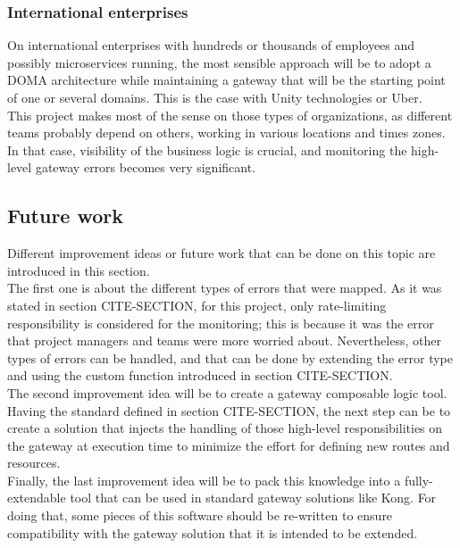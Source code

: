 \documentclass[english, 12pt, a4paper, sci, utf8, a-1b, online]{aaltothesis}
\begin{document}
\subsubsection*{International enterprises}
On international enterprises with hundreds or thousands of employees and possibly microservices running, the most sensible approach will be to adopt a DOMA architecture while maintaining a gateway that will be the starting point of one or several domains. This is the case with Unity technologies or Uber.\\

This project makes most of the sense on those types of organizations, as different teams probably depend on others, working in various locations and times zones. In that case, visibility of the business logic is crucial, and monitoring the high-level gateway errors becomes very significant.

\subsection{Future work}
Different improvement ideas or future work that can be done on this topic are introduced in this section.\\

The first one is about the different types of errors that were mapped. As it was stated in section CITE-SECTION, for this project, only rate-limiting responsibility is considered for the monitoring; this is because it was the error that project managers and teams were more worried about. Nevertheless, other types of errors can be handled, and that can be done by extending the error type and using the custom function introduced in section CITE-SECTION.\\

The second improvement idea will be to create a gateway composable logic tool. Having the standard defined in section CITE-SECTION, the next step can be to create a solution that injects the handling of those high-level responsibilities on the gateway at execution time to minimize the effort for defining new routes and resources.\\

Finally, the last improvement idea will be to pack this knowledge into a fully-extendable tool that can be used in standard gateway solutions like Kong. For doing that, some pieces of this software should be re-written to ensure compatibility with the gateway solution that it is intended to be extended.

\clearpage
\thesisbibliography
\end{document}
